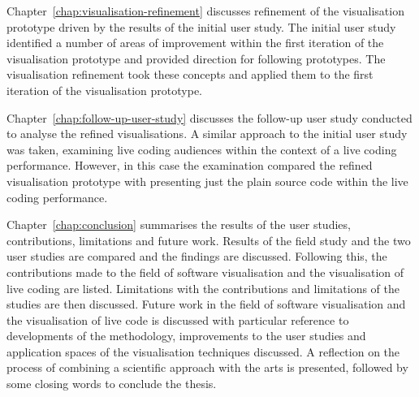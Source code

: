 Chapter~\ref{chap:visualisation-refinement} discusses refinement of the visualisation prototype driven by the results of the initial user study. The initial user study identified a number of areas of improvement within the first iteration of the visualisation prototype and provided direction for following prototypes. The visualisation refinement took these concepts and applied them to the first iteration of the visualisation prototype.

Chapter~\ref{chap:follow-up-user-study} discusses the follow-up user study conducted to analyse the refined visualisations. A similar approach to the initial user study was taken, examining live coding audiences within the context of a live coding performance. However, in this case the examination compared the refined visualisation prototype with presenting just the plain source code within the live coding performance.

Chapter~\ref{chap:conclusion} summarises the results of the user studies, contributions, limitations and future work. Results of the field study and the two user studies are compared and the findings are discussed. Following this, the contributions made to the field of software visualisation and the visualisation of live coding are listed. Limitations with the contributions and limitations of the studies are then discussed. Future work in the field of software visualisation and the visualisation of live code is discussed with particular reference to developments of the methodology, improvements to the user studies and application spaces of the visualisation techniques discussed. A reflection on the process of combining a scientific approach with the arts is presented, followed by some closing words to conclude the thesis.


